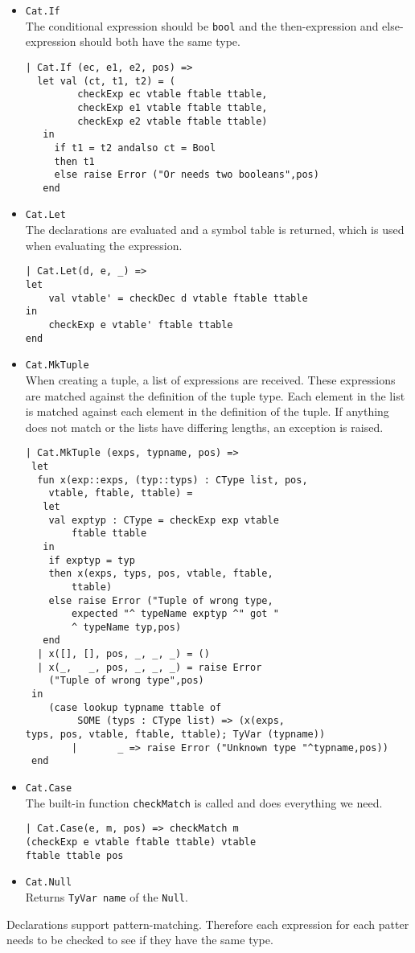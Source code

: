 \documentclass{article}
\begin{document}
\begin{itemize}
	\item {\tt Cat.If} \\
	The conditional expression should be {\tt bool} and the then-expression and else-expression should both have the same type.
	\begin{lstlisting}
| Cat.If (ec, e1, e2, pos) =>
  let val (ct, t1, t2) = (
         checkExp ec vtable ftable ttable,
         checkExp e1 vtable ftable ttable, 
         checkExp e2 vtable ftable ttable)
   in
     if t1 = t2 andalso ct = Bool
     then t1
     else raise Error ("Or needs two booleans",pos)
   end
	\end{lstlisting}
	\item {\tt Cat.Let} \\
	The declarations are evaluated and a symbol table is returned, which is used when evaluating the expression.
	\begin{lstlisting}
| Cat.Let(d, e, _) =>
let
    val vtable' = checkDec d vtable ftable ttable
in
    checkExp e vtable' ftable ttable
end
	\end{lstlisting}
	\item {\tt Cat.MkTuple} \\
	When creating a tuple, a list of expressions are received. These expressions are matched against the definition of the tuple type. Each element in the list is matched against each element in the definition of the tuple. If anything does not match or the lists have differing lengths, an exception is raised.
	\begin{lstlisting}
| Cat.MkTuple (exps, typname, pos) =>
 let
  fun x(exp::exps, (typ::typs) : CType list, pos, 
	vtable, ftable, ttable) = 
   let
    val exptyp : CType = checkExp exp vtable 
		ftable ttable
   in
    if exptyp = typ
    then x(exps, typs, pos, vtable, ftable, 
		ttable)
    else raise Error ("Tuple of wrong type, 
		expected "^ typeName exptyp ^" got " 
		^ typeName typ,pos)
   end
  | x([], [], pos, _, _, _) = ()
  | x(_,   _, pos, _, _, _) = raise Error 
	("Tuple of wrong type",pos)
 in
    (case lookup typname ttable of
         SOME (typs : CType list) => (x(exps, 
typs, pos, vtable, ftable, ttable); TyVar (typname))
        |       _ => raise Error ("Unknown type "^typname,pos))
 end
	\end{lstlisting}
	\item {\tt Cat.Case} \\
	The built-in function {\tt checkMatch} is called and does everything we need.
	\begin{lstlisting}
| Cat.Case(e, m, pos) => checkMatch m 
(checkExp e vtable ftable ttable) vtable 
ftable ttable pos
	\end{lstlisting}
	\item {\tt Cat.Null} \\
	Returns {\tt TyVar name} of the {\tt Null}.
\end{itemize}
Declarations support pattern-matching. Therefore each expression for each patter needs to be checked to see if they have the same type.
\end{document}
